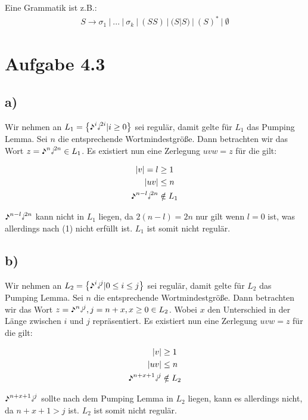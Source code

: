 \documentclass{article}
\begin{document}
Eine Grammatik ist z.B.:
\begin{align*}
S \rightarrow \sigma_1\ |\ ...\ |\ \sigma_k\ |\ (SS)\ |\ (S|S)\ |\ (S)^*\ |\ \emptyset
\end{align*}



\section*{Aufgabe 4.3}
\subsection*{a)}
Wir nehmen an $L_1=\left\{\eighthnote^i\halfnote^{2i} | i \geq 0\right\}$ sei regulär, damit gelte für $L_1$ das Pumping Lemma. Sei $n$ die entsprechende Wortmindestgröße. Dann betrachten wir das Wort $z=\eighthnote^n\halfnote^{2n} \in L_1$. Es existiert nun eine Zerlegung $uvw=z$ für die gilt:

\begin{align}
|v| = l &\geq 1\\
|uv| &\leq n\\
\eighthnote^{n-l}\halfnote^{2n} &\notin L_1
\end{align}

$\eighthnote^{n-l}\halfnote^{2n}$ kann nicht in $L_1$ liegen, da $2(n-l) = 2n$ nur gilt wenn $l=0$ ist, was allerdings nach (1) nicht erfüllt ist. $L_1$ ist somit nicht regulär.
\setcounter{equation}{0}


\subsection*{b)}
Wir nehmen an $L_2=\left\{\eighthnote^i\halfnote^j | 0\leq i \leq j\right\}$ sei regulär, damit gelte für $L_2$ das Pumping Lemma. Sei $n$ die entsprechende Wortmindestgröße. Dann betrachten wir das Wort $z=\eighthnote^n\halfnote^j, j = n + x, x \geq 0 \in L_2$. Wobei $x$ den Unterschied in der Länge zwischen $i$ und $j$ repräsentiert. Es existiert nun eine Zerlegung $uvw=z$ für die gilt:

\begin{align}
|v| &\geq 1\\
|uv| &\leq n\\
\eighthnote^{n+x+1}\halfnote^{j} &\notin L_2
\end{align}

$\eighthnote^{n+x+1}\halfnote^{j}$ sollte nach dem Pumping Lemma in $L_2$ liegen, kann es allerdings nicht, da $n+x+1 > j $ ist. $L_2$ ist somit nicht regulär.
\setcounter{equation}{0}
\end{document}
